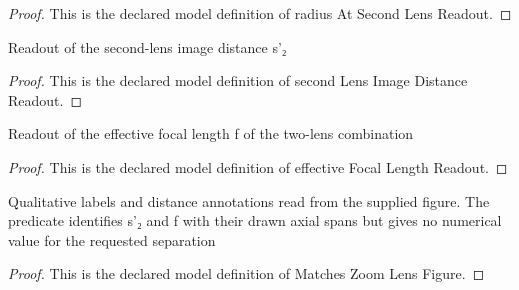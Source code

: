 \begin{proof}
  This is the declared model definition of radius At Second Lens Readout.
\end{proof}
\begin{definition}
  \label{def:physics:phyx-mini-0112:phyxminiproblems-problemphyxmini0112-secondlensimagedistancereadout}
  Readout of the second-lens image distance s'₂
\end{definition}
\begin{proof}
  This is the declared model definition of second Lens Image Distance Readout.
\end{proof}
\begin{definition}
  \label{def:physics:phyx-mini-0112:phyxminiproblems-problemphyxmini0112-effectivefocallengthreadout}
  Readout of the effective focal length f of the two-lens combination
\end{definition}
\begin{proof}
  This is the declared model definition of effective Focal Length Readout.
\end{proof}
\begin{definition}
  \label{def:physics:phyx-mini-0112:phyxminiproblems-problemphyxmini0112-matcheszoomlensfigure}
  Qualitative labels and distance annotations read from the supplied figure. The predicate identifies s'₂ and f with their drawn axial spans but gives no numerical value for the requested separation
\end{definition}
\begin{proof}
  This is the declared model definition of Matches Zoom Lens Figure.
\end{proof}
